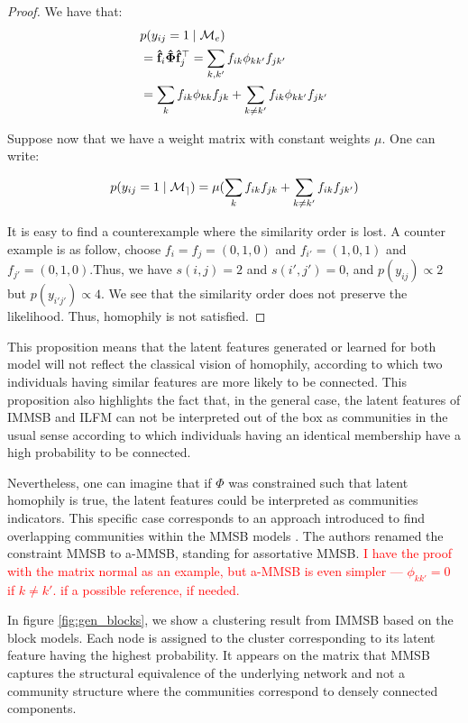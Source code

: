\begin{proof}
We have that:
\begin{align}
&p(y_{ij}=1 \mid \mathcal{M}_e) \nonumber \\
&=  \mathbf{\hat{f}}_{i} \mathbf{\hat{\Phi}} \mathbf{\hat{f}}_j^\top \nonumber = \sum_{k,k'} f_{ik}\phi_{kk'}f_{jk'}   \nonumber \\
&= \sum_k f_{ik}\phi_{kk}f_{jk} + \sum_{k\neq k'} f_{ik}\phi_{kk'}f_{jk'} \nonumber
\end{align}

 Suppose now that we have a weight matrix with constant weights $\mu$. One can write:

\begin{equation}
p(y_{ij}=1 \mid \mathcal{M_e})= \mu (\sum_k f_{ik}f_{jk} + \sum_{k\neq k'} f_{ik}f_{jk'} ) \nonumber
\end{equation}

It is easy to find a counterexample where the similarity order is lost. A counter example is as follow, choose $f_i=f_j=(0,1,0)$ and $f_{i'}=(1,0,1)$ and $f_{j'}=(0,1,0)$.Thus,  we have $s(i,j)=2$ and $s(i',j')=0$, and $p(y_{ij}) \propto 2$ but $p(y_{i'j'}) \propto 4$. We see that the similarity order does not preserve the likelihood. Thus, homophily is not satisfied. 
\end{proof} 



This proposition means that the latent features generated or learned for both model will not reflect the classical vision of homophily, according to which two individuals having similar features are more  likely to be connected. This proposition also highlights the fact that, in the general case,  the latent features of IMMSB and ILFM can not be interpreted out of the box as communities in the usual sense according to which  individuals having an identical membership have a high probability to be connected.

Nevertheless, one can imagine that if  $\Phi$ was constrained such that latent homophily is true,  the latent features could be interpreted as communities indicators. This  specific case corresponds to an approach introduced to find overlapping communities within the MMSB models \cite{AMMSB}. The authors renamed the constraint MMSB to a-MMSB, standing for assortative MMSB. \textcolor{red}{I have the proof with the matrix normal as an example, but a-MMSB is even simpler --- $\phi_{kk'}=0$ if $k\neq k'$. if a possible reference, if needed.}

In figure \ref{fig:gen_blocks}, we show a clustering result from IMMSB based on the block models. Each node is assigned to the cluster  corresponding to its latent feature having the highest probability.  It appears on the matrix that MMSB captures the structural equivalence of the underlying network and not a community structure where the communities correspond to densely connected components.


